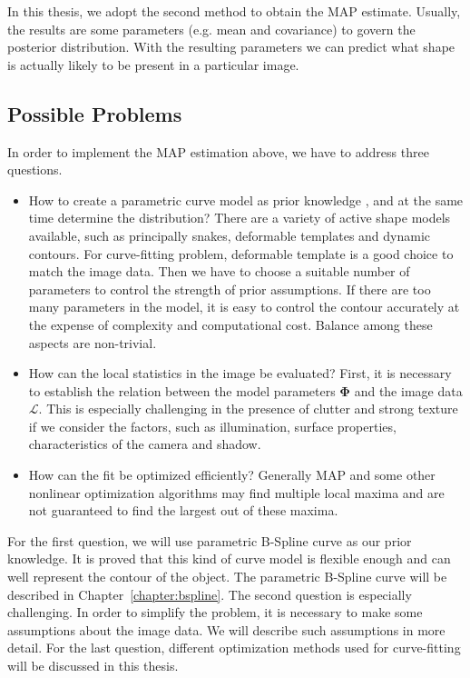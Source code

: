 In this thesis, we adopt the second method to obtain the MAP estimate.
Usually, the results are some parameters (e.g. mean and covariance) to
govern the posterior distribution. With the resulting parameters we
can predict what shape is actually likely to be present in a particular image.


\subsection{Possible Problems}
\label{sec:prob}
In order to implement the MAP estimation above, we have to address
three questions.

\begin{itemize}
\item How to create a parametric curve model as prior knowledge , and
  at the same time determine the distribution? There are a variety of
  active shape models available, such as principally snakes,
  deformable templates and dynamic contours. For curve-fitting
  problem, deformable template is a good choice to match the image
  data. Then we have to choose a suitable number of parameters to control
  the strength of prior assumptions. If there are too many parameters
  in the model, it is easy to control the contour accurately at the
  expense of complexity and computational cost. Balance among these
  aspects are non-trivial.

\item How can the local statistics in the image be evaluated? First, it
  is necessary to establish the relation between the model parameters
  $\mathbf{\Phi}$ and the image data $\mathcal{L}$. This is especially
challenging in the presence of clutter and strong texture if we
consider the factors, such as  illumination, surface properties,
characteristics of the camera and shadow. 

\item How can the fit be optimized efficiently? Generally MAP and some
  other nonlinear optimization algorithms may find multiple local
  maxima and are not guaranteed to find the largest out of these maxima.
\end{itemize}


For the first question, we will use parametric B-Spline curve as
our prior knowledge. It is proved that this kind of curve model is
flexible enough and can well represent the contour of the object. The
parametric B-Spline curve will be described in Chapter~\ref{chapter:bspline}.
The second question is especially challenging. In order to simplify
the problem, it is necessary to make some assumptions about the image
data. We will describe such assumptions in more detail. For the last
question, different optimization methods used for curve-fitting will
be discussed in this thesis.

